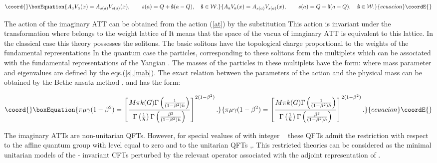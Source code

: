 \documentclass[a4paper,12pt]{article}
\begin{document}
\begin{equation}\coord{}\boxEquation{
A_aV_a(x)=A_{s(a)}V_{s(a)}(x),\qquad s(a)=Q+{\bf \hat{s}}(a-Q),\quad {\bf 
\hat{s}}\in {\cal W}.  \label{rere}
}{
A_aV_a(x)=A_{s(a)}V_{s(a)}(x),\qquad s(a)=Q+{\bf \hat{s}}(a-Q),\quad {\bf 
\hat{s}}\in {\cal W}.  }{ecuacion}\coordE{}\end{equation}

The action \coordHE{} of the imaginary ATT can be obtained from the
action (\ref{at}) by the substitution \coordHE{} This action is invariant under the transformation 
\myHighlight{$\varphi \rightarrow \varphi +2\pi \theta /\beta ,$}\coordHE{} where \myHighlight{$\theta $}\coordHE{} belongs
to the weight lattice of \coordHE{} It means that the space of the vacua of
imaginary ATT is equivalent to this lattice. In the classical case this
theory possesses the solitons. The basic solitons have the topological charge
proportional to the weights of the fundamental representations \coordHE{}
In the quantum case the particles, corresponding to these solitons form the
multiplets which can be associated with the fundamental representations of
the Yangian \coordHE{}. The masses \coordHE{}  \coordHE{} of the particles in
these multiplets have the form: \coordHE{} where mass parameter \coordHE{} and
eigenvalues \coordHE{} are defined by the eqs.(\ref{s},\ref{mab}). The exact
relation between the parameters of the action \coordHE{} and the
physical mass \coordHE{} can be obtained by the Bethe ansatz method \cite{ALZ},\cite
{F} and has the form:

\begin{equation}\coord{}\boxEquation{
\pi \mu \gamma (1-\beta ^2)=\left[ \frac{M\pi k(G)\Gamma \left( \frac 1{
(1-\beta ^2)h}\right) }{\Gamma \left( \frac 1h\right) \Gamma \left( \frac{
\beta ^2}{(1-\beta ^2)h}\right) }\right] ^{2(1-\beta ^2)}.  \label{immu}
}{
\pi \mu \gamma (1-\beta ^2)=\left[ \frac{M\pi k(G)\Gamma \left( \frac 1{
(1-\beta ^2)h}\right) }{\Gamma \left( \frac 1h\right) \Gamma \left( \frac{
\beta ^2}{(1-\beta ^2)h}\right) }\right] ^{2(1-\beta ^2)}.  }{ecuacion}\coordE{}\end{equation}

The imaginary ATTs are non-unitarian QFTs. However, for special vealues of 
 \coordHE{}
with integer \ \coordHE{} these QFTs admit the restriction with respect to the
affine quantum group \coordHE{} with level equal to zero and 
\coordHE{} to the unitarian QFTs \cite{RS},\cite{BL}. 
This restricted theories can be 
considered as the minimal unitarian models 
\coordHE{} of the \coordHE{}- invariant
CFTs perturbed by the relevant operator \coordHE{}
associated with the adjoint representation of \coordHE{}. 
\end{document}
